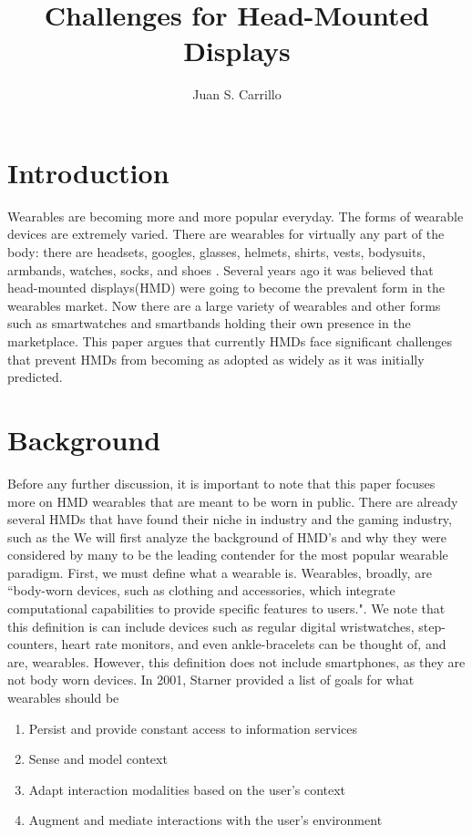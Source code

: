 \documentclass[11pt]{article}
\title{Challenges for Head-Mounted Displays}
\author{Juan S. Carrillo}
\begin{document}
\maketitle
\section{Introduction}
Wearables are becoming more and more popular everyday. The forms of wearable devices are extremely varied. There are wearables for virtually any part of the body: there are headsets, googles, glasses, helmets, shirts, vests, bodysuits, armbands, watches, socks, and shoes \cite{VandricoList}. Several years ago it was believed that head-mounted displays(HMD) were going to become the prevalent form in the wearables market\cite{ultimateWearable}. Now there are a large variety of wearables and other forms such as smartwatches and smartbands holding their own presence in the marketplace. This paper argues that currently HMDs face significant challenges that prevent HMDs from becoming as adopted as widely as it was initially predicted.

\section{Background}

Before any further discussion, it is important to note that this paper focuses more on HMD wearables that are meant to be worn in public. There are already several HMDs that have found their niche in industry and the gaming industry, such as the  
We will first analyze the background of HMD's and why they were considered by many to be the leading contender for the most popular wearable paradigm. First, we must define what a wearable is. Wearables, broadly, are ``body-worn devices, such as clothing and accessories, which integrate computational capabilities to provide specific features to users."\cite{WearableHumanView}. We note that this definition is can include devices such as regular digital wristwatches, step-counters, heart rate monitors, and even ankle-bracelets can be thought of, and are, wearables. However, this definition does not include smartphones, as they are not body worn devices. In 2001, Starner provided a list of goals\cite{starnerChallenges1} for what wearables should be
\begin{enumerate}
    \item Persist and provide constant access to information services
    \item Sense and model context
    \item Adapt interaction modalities based on the user's context
    \item Augment and mediate interactions with the user's environment
\end{enumerate}
\end{document}
